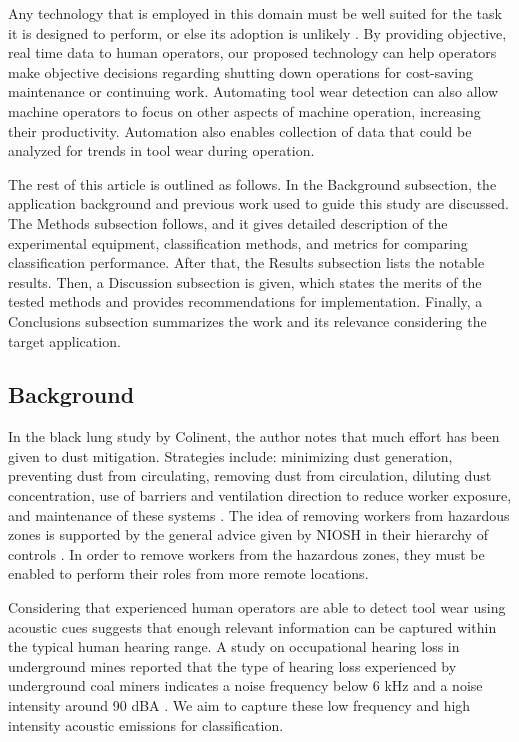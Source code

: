 Any technology that is employed in this domain must be well suited for the task it is
designed to perform, or else its adoption is unlikely \cite{Swanson2019}.
By providing objective, real time data to human operators, 
our proposed technology can help operators make objective decisions 
regarding shutting down operations for cost-saving maintenance or continuing work.
Automating tool wear detection can also allow machine operators to focus on other aspects of machine operation, 
increasing their productivity.
Automation also enables collection of data that could be analyzed for trends in tool wear during operation.

The rest of this article is outlined as follows. 
In the Background subsection, the application background
 and previous work used to guide this study are discussed.
The Methods subsection follows, and it gives detailed description of the 
 experimental equipment, classification methods, and metrics for comparing classification performance.
After that, the Results subsection lists the notable results.
Then, a Discussion subsection is given, which states the merits of the tested methods 
 and provides recommendations for implementation.
Finally, a Conclusions subsection summarizes the work and its relevance considering the target application.

\subsection{Background}\label{sec1a}

In the black lung study by Colinent, the author notes that much effort has been given to dust mitigation.
Strategies include: minimizing dust generation, preventing dust from circulating, removing
dust from circulation, diluting dust concentration, use of barriers and ventilation direction
to reduce worker exposure, and maintenance of these systems \cite{Colinent2020}. 
The idea of removing workers from hazardous zones is supported 
 by the general advice given by NIOSH in their hierarchy of controls \cite{niosh_2015}.
In order to remove workers from the hazardous zones, they must be enabled to perform their roles from 
more remote locations. 

Considering that experienced human operators are able to detect tool wear using acoustic cues
suggests that enough relevant information can be captured within the typical human hearing range.
A study on occupational hearing loss in underground mines reported that the type of hearing loss experienced 
by underground coal miners indicates a noise frequency below 6 kHz and a noise intensity 
around 90 dBA \cite{Erol2022}. 
We aim to capture these low frequency and high intensity acoustic emissions for classification.

